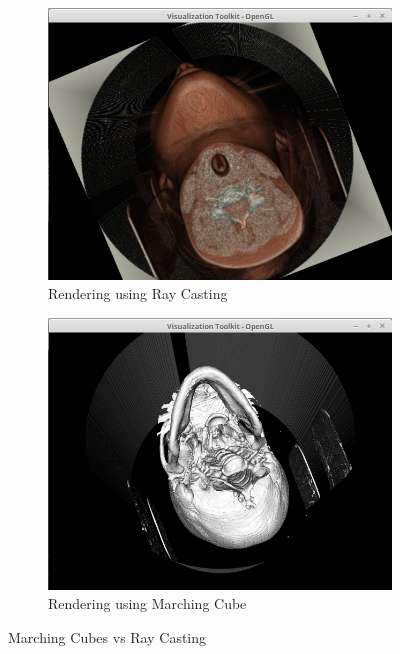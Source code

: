 \documentclass[10pt, b5paper]{article}
\begin{document}
\begin{figure}
    \centering
    \begin{subfigure}[b]{0.45\textwidth}
        \centering
        \includegraphics[width=\textwidth]{3D-RC}
        \caption{Rendering using Ray Casting}
        \label{fig:3D-CM}
    \end{subfigure}
    \hfill
    \begin{subfigure}[b]{0.45\textwidth}
        \centering
        \includegraphics[width=\textwidth]{3D-CM}
        \caption{Rendering using Marching Cube}
        \label{fig:3D-RC}
    \end{subfigure}
    \caption{Marching Cubes vs Ray Casting}
    \label{fig:RC-CM}
\end{figure}
\end{document}
